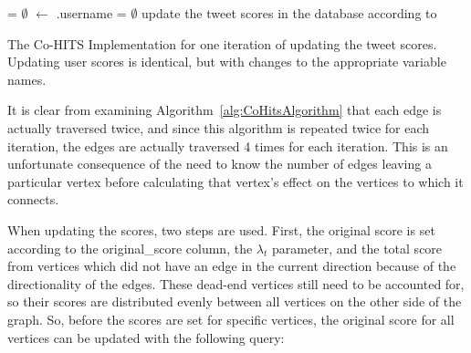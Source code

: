 \begin{algorithm}
 \TweetScores = $\emptyset$\;
 \LastName $\leftarrow$ \FirstEdge.username\;
 \CurUserEdges = $\emptyset$\;
 update the tweet scores in the database according to \TweetScores
 \caption{The Co-HITS Implementation for one iteration of updating the tweet scores. Updating user scores is identical, but with changes to the appropriate variable names.}
 \label{alg:CoHitsAlgorithm}
\end{algorithm}

It is clear from examining Algorithm~\ref{alg:CoHitsAlgorithm} that each edge is actually traversed twice, and since this algorithm is repeated twice for each iteration, the edges are actually traversed 4 times for each iteration. This is an unfortunate consequence of the need to know the number of edges leaving a particular vertex before calculating that vertex's effect on the vertices to which it connects.

When updating the scores, two steps are used. First, the original score is set according to the original\_score column, the $\lambda_{t}$ parameter, and the total score from vertices which did not have an edge in the current direction because of the directionality of the edges. These dead-end vertices still need to be accounted for, so their scores are distributed evenly between all vertices on the other side of the graph. So, before the scores are set for specific vertices, the original score for all vertices can be updated with the following query:

